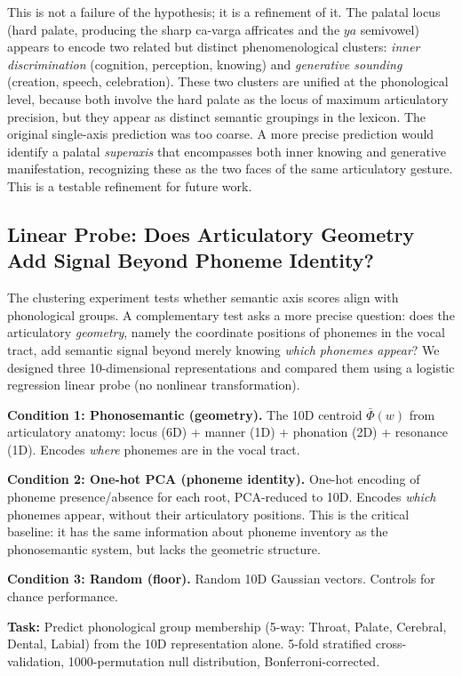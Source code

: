 \documentclass[12pt]{article}
\begin{document}
This is not a failure of the hypothesis; it is a refinement of it. The palatal locus (hard palate, producing the sharp ca-varga affricates and the $ya$ semivowel) appears to encode two related but distinct phenomenological clusters: \textit{inner discrimination} (cognition, perception, knowing) and \textit{generative sounding} (creation, speech, celebration). These two clusters are unified at the phonological level, because both involve the hard palate as the locus of maximum articulatory precision, but they appear as distinct semantic groupings in the lexicon. The original single-axis prediction was too coarse. A more precise prediction would identify a palatal \textit{superaxis} that encompasses both inner knowing and generative manifestation, recognizing these as the two faces of the same articulatory gesture. This is a testable refinement for future work.

\subsection{Linear Probe: Does Articulatory Geometry Add Signal Beyond Phoneme Identity?}

The clustering experiment tests whether semantic axis scores align with phonological groups. A complementary test asks a more precise question: does the articulatory \textit{geometry}, namely the coordinate positions of phonemes in the vocal tract, add semantic signal beyond merely knowing \textit{which phonemes appear}? We designed three 10-dimensional representations and compared them using a logistic regression linear probe (no nonlinear transformation).

\textbf{Condition 1: Phonosemantic (geometry).} The 10D centroid $\bar{\Phi}(w)$ from articulatory anatomy: locus (6D) + manner (1D) + phonation (2D) + resonance (1D). Encodes \textit{where} phonemes are in the vocal tract.

\textbf{Condition 2: One-hot PCA (phoneme identity).} One-hot encoding of phoneme presence/absence for each root, PCA-reduced to 10D. Encodes \textit{which} phonemes appear, without their articulatory positions. This is the critical baseline: it has the same information about phoneme inventory as the phonosemantic system, but lacks the geometric structure.

\textbf{Condition 3: Random (floor).} Random 10D Gaussian vectors. Controls for chance performance.

\textbf{Task:} Predict phonological group membership (5-way: Throat, Palate, Cerebral, Dental, Labial) from the 10D representation alone. 5-fold stratified cross-validation, 1000-permutation null distribution, Bonferroni-corrected.
\end{document}
